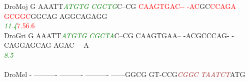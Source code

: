 \documentclass[11pt,twoside,reqno,a4paper]{article}
\begin{document}
{DroMoj	G	AAATT\textit{\textcolor{Green}{A}}\textit{\textcolor{Green}{T}}\textit{\textcolor{Green}{G}}\textit{\textcolor{Green}{T}}\textit{\textcolor{Green}{G}}	\textit{\textcolor{Green}{C}}\textit{\textcolor{Green}{G}}\textit{\textcolor{Green}{C}}\textit{\textcolor{Green}{T}}\textit{\textcolor{Green}{G}}C--CG	\textcolor{Red}{C}\textcolor{Red}{A}\textcolor{Red}{A}\textcolor{Red}{G}\textcolor{Red}{T}\textcolor{Red}{G}\textcolor{Red}{A}\textcolor{Red}{C}\textcolor{Red}{-}\textcolor{Red}{-}	\textcolor{Red}{-}\textcolor{Red}{A}\textcolor{Red}{C}GC\textcolor{Red}{C}\textcolor{Red}{C}\textcolor{Red}{A}\textcolor{Red}{G}\textcolor{Red}{A}	\textcolor{Red}{G}\textcolor{Red}{C}\textcolor{Red}{G}\textcolor{Red}{G}\textcolor{Red}{C}GGCAG	AGGCAGAGG\\
\hspace*{7\charwidth}\hspace*{1\charwidth}\hspace*{6\charwidth}\textit{\textcolor{Green}{11.4}}\hspace*{1\charwidth}\hspace*{1\charwidth}\hspace*{11\charwidth}\textcolor{Red}{7.5}\hspace*{1\charwidth}\hspace*{12\charwidth}\textcolor{Red}{6.6}\hspace*{1\charwidth}\hspace*{1\charwidth}\\
DroGri	G	AAATT\textit{\textcolor{Green}{A}}\textit{\textcolor{Green}{T}}\textit{\textcolor{Green}{G}}\textit{\textcolor{Green}{T}}\textit{\textcolor{Green}{G}}	\textit{\textcolor{Green}{C}}\textit{\textcolor{Green}{G}}\textit{\textcolor{Green}{C}}\textit{\textcolor{Green}{T}}\textit{\textcolor{Green}{A}}C--CG	CAAGTGAA--	-ACGCCCAG-	-CAGGAGCAG	AGAC----A\\
\hspace*{7\charwidth}\hspace*{1\charwidth}\hspace*{6\charwidth}\textit{\textcolor{Green}{8.5}}\hspace*{1\charwidth}\hspace*{1\charwidth}\hspace*{1\charwidth}\hspace*{1\charwidth}\hspace*{1\charwidth}\\
\\
DroMel	-	----------	----------	----------	------GGCG	GT-CCG\textit{\textcolor{Brown}{C}}\textit{\textcolor{Brown}{G}}\textit{\textcolor{Brown}{G}}\textit{\textcolor{Brown}{C}}	\textit{\textcolor{Brown}{T}}\textit{\textcolor{Brown}{A}}\textit{\textcolor{Brown}{A}}\textit{\textcolor{Brown}{T}}\textit{\textcolor{Brown}{C}}\textit{\textcolor{Brown}{T}}ATG\\
}
\end{document}

